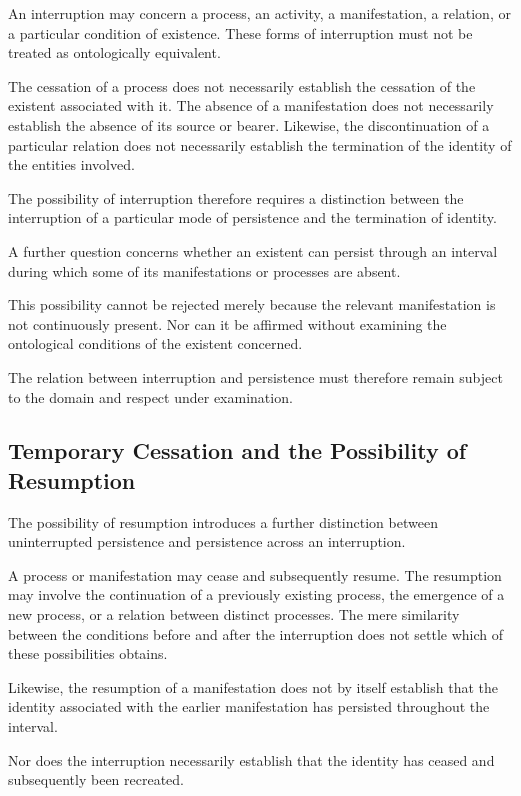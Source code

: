 An interruption may concern a process, an activity,
a manifestation, a relation, or a particular condition
of existence. These forms of interruption must not
be treated as ontologically equivalent.

The cessation of a process does not necessarily establish
the cessation of the existent associated with it.
The absence of a manifestation does not necessarily
establish the absence of its source or bearer.
Likewise, the discontinuation of a particular relation
does not necessarily establish the termination of
the identity of the entities involved.

The possibility of interruption therefore requires
a distinction between the interruption of a particular
mode of persistence and the termination of identity.

A further question concerns whether an existent can
persist through an interval during which some of its
manifestations or processes are absent.

This possibility cannot be rejected merely because
the relevant manifestation is not continuously present.
Nor can it be affirmed without examining the ontological
conditions of the existent concerned.

The relation between interruption and persistence
must therefore remain subject to the domain and respect
under examination.

\subsection{Temporary Cessation and the Possibility of Resumption}

The possibility of resumption introduces a further
distinction between uninterrupted persistence and
persistence across an interruption.

A process or manifestation may cease and subsequently
resume. The resumption may involve the continuation
of a previously existing process, the emergence of
a new process, or a relation between distinct processes.
The mere similarity between the conditions before
and after the interruption does not settle which of
these possibilities obtains.

Likewise, the resumption of a manifestation does not
by itself establish that the identity associated with
the earlier manifestation has persisted throughout
the interval.

Nor does the interruption necessarily establish that
the identity has ceased and subsequently been recreated.

